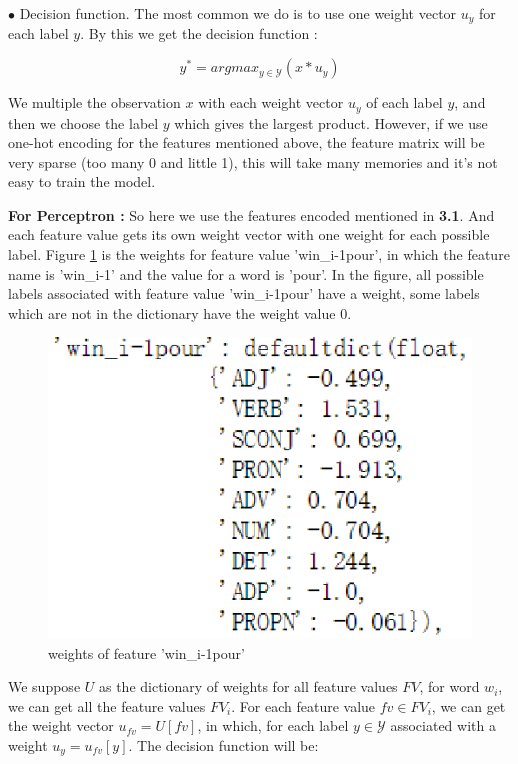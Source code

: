\documentclass{article}
\def\YY{{\mathcal{Y}}}
\begin{document}
$\bullet$ Decision function. The most common we do is to use one weight vector $u_y$ for each label $y$. By this we get the decision function :

\begin{equation}
y^* = argmax_{y \in \YY} (x*u_y)
\end{equation}

We multiple the observation $x$ with each weight vector $u_y$ of each label $y$, and then we choose the label $y$ which gives the largest product. However, if we use one-hot encoding for the features mentioned above, the feature matrix will be very sparse (too many 0 and little 1), this will take many memories and it's not easy to train the model.

\textbf{For Perceptron : } So here we use the features encoded mentioned in \textbf{3.1}. And each feature value gets its own weight vector with one weight for each possible label. Figure \ref{figure2} is the weights for feature value 'win\_i-1pour', in which the feature name is 'win\_i-1' and the value for a word is 'pour'. In the figure, all possible labels associated with feature value 'win\_i-1pour' have a weight, some labels which are not in the dictionary have the weight value 0.

\begin{figure}[ht]
\centering
\includegraphics[scale=1]{weightpour.eps}
\caption{weights of feature 'win\_i-1pour'}
\label{figure2}
\end{figure}

We suppose $U$ as the dictionary of weights for all feature values $FV$,  for word $w_i$, we can get all the feature values $FV_i$. For each feature value $fv \in FV_i$, we can get the weight vector $u_{fv} = U[fv]$, in which, for each label $y \in \YY$ associated with a weight $u_y = u_{fv} [y]$. The decision function will be:
\end{document}
